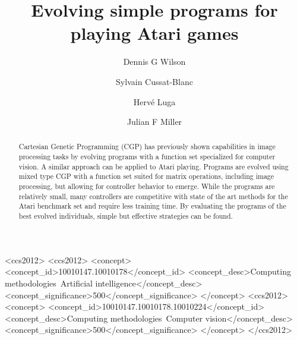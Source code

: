 \documentclass[sigconf,screen]{acmart}\settopmatter{printfolios=true,printacmref=false}
\begin{document}
\title{Evolving simple programs for playing Atari games}

\author{Dennis G Wilson}

\author{Sylvain Cussat-Blanc}

\author{Herv\'e Luga}

\author{Julian F Miller}

\renewcommand{\shortauthors}{DG Wilson et al.}
\def\sectionautorefname{Section}
\def\subsectionautorefname{Section}

\begin{abstract}
  Cartesian Genetic Programming (CGP) has previously shown capabilities in image
processing tasks by evolving programs with a function set specialized for
computer vision. A similar approach can be applied to Atari playing. Programs
are evolved using mixed type CGP with a function set suited for matrix
operations, including image processing, but allowing for controller behavior to
emerge. While the programs are relatively small, many controllers are
competitive with state of the art methods for the Atari benchmark set and
require less training time. By evaluating the programs of the best evolved
individuals, simple but effective strategies can be found.
 \end{abstract}

\begin{CCSXML}
<ccs2012>
<ccs2012>
<concept>
<concept_id>10010147.10010178</concept_id>
<concept_desc>Computing methodologies~Artificial intelligence</concept_desc>
<concept_significance>500</concept_significance>
</concept>
<ccs2012>
<concept>
<concept_id>10010147.10010178.10010224</concept_id>
<concept_desc>Computing methodologies~Computer vision</concept_desc>
<concept_significance>500</concept_significance>
</concept>
</ccs2012>
\end{CCSXML}

\end{document}
